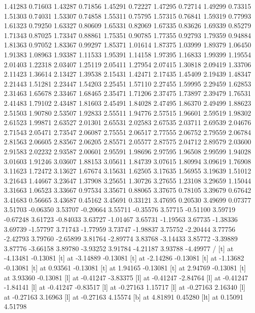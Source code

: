 1.41283 0.71603
1.43287 0.71856
1.45291 0.72227
1.47295 0.72714
1.49299 0.73315
1.51303 0.74031
1.53307 0.74858
1.55311 0.75795
1.57315 0.76841
1.59319 0.77993
1.61323 0.79250
1.63327 0.80609
1.65331 0.82069
1.67335 0.83626
1.69339 0.85279
1.71343 0.87025
1.73347 0.88861
1.75351 0.90785
1.77355 0.92793
1.79359 0.94884
1.81363 0.97052
1.83367 0.99297
1.85371 1.01614
1.87375 1.03999
1.89379 1.06450
1.91383 1.08963
1.93387 1.11533
1.95391 1.14158
1.97395 1.16833
1.99399 1.19554
2.01403 1.22318
2.03407 1.25119
2.05411 1.27954
2.07415 1.30818
2.09419 1.33706
2.11423 1.36614
2.13427 1.39538
2.15431 1.42471
2.17435 1.45409
2.19439 1.48347
2.21443 1.51281
2.23447 1.54203
2.25451 1.57110
2.27455 1.59995
2.29459 1.62853
2.31463 1.65678
2.33467 1.68465
2.35471 1.71206
2.37475 1.73897
2.39479 1.76531
2.41483 1.79102
2.43487 1.81603
2.45491 1.84028
2.47495 1.86370
2.49499 1.88623
2.51503 1.90780
2.53507 1.92833
2.55511 1.94776
2.57515 1.96601
2.59519 1.98302
2.61523 1.99871
2.63527 2.01301
2.65531 2.02583
2.67535 2.03711
2.69539 2.04676
2.71543 2.05471
2.73547 2.06087
2.75551 2.06517
2.77555 2.06752
2.79559 2.06784
2.81563 2.06605
2.83567 2.06205
2.85571 2.05577
2.87575 2.04712
2.89579 2.03600
2.91583 2.02232
2.93587 2.00601
2.95591 1.98696
2.97595 1.96508
2.99599 1.94028
3.01603 1.91246
3.03607 1.88153
3.05611 1.84739
3.07615 1.80994
3.09619 1.76908
3.11623 1.72472
3.13627 1.67674
3.15631 1.62505
3.17635 1.56955
3.19639 1.51012
3.21643 1.44667
3.23647 1.37908
3.25651 1.30726
3.27655 1.23108
3.29659 1.15044
3.31663 1.06523
3.33667 0.97534
3.35671 0.88065
3.37675 0.78105
3.39679 0.67642
3.41683 0.56665
3.43687 0.45162
3.45691 0.33121
3.47695 0.20530
3.49699 0.07377
3.51703 -0.06350
3.53707 -0.20664
3.55711 -0.35576
3.57715 -0.51100
3.59719 -0.67248
3.61723 -0.84033
3.63727 -1.01467
3.65731 -1.19563
3.67735 -1.38336
3.69739 -1.57797
3.71743 -1.77959
3.73747 -1.98837
3.75752 -2.20444
3.77756 -2.42793
3.79760 -2.65899
3.81764 -2.89774
3.83768 -3.14433
3.85772 -3.39889
3.87776 -3.66158
3.89780 -3.93252
3.91784 -4.21187
3.93788 -4.49977
/
 [t] at -4.13481 -0.13081
 [t] at -3.14889 -0.13081
 [t] at -2.14286 -0.13081
 [t] at -1.13682 -0.13081
 [t] at 0.93561 -0.13081
 [t] at 1.94165 -0.13081
 [t] at 2.94769 -0.13081
 [t] at 3.93360 -0.13081
 [l] at -0.41247 -3.83375
 [l] at -0.41247 -2.84764
 [l] at -0.41247 -1.84141
 [l] at -0.41247 -0.83517
 [l] at -0.27163 1.15717
 [l] at -0.27163 2.16340
 [l] at -0.27163 3.16963
 [l] at -0.27163 4.15574
 [b] at 4.81891 0.45280
 [lt] at 0.15091 4.51798
\endpicture